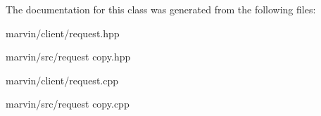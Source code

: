 The documentation for this class was generated from the following files\+:\begin{DoxyCompactItemize}
\item 
marvin/client/request.\+hpp\item 
marvin/src/request copy.\+hpp\item 
marvin/client/request.\+cpp\item 
marvin/src/request copy.\+cpp\end{DoxyCompactItemize}
